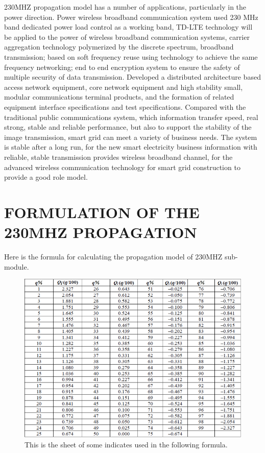 \documentclass[12pt,a4paper,twocolumn,fleqn]{narms}
\begin{document}
230MHZ propagation model has a number of applications, particularly in the power direction\cite{bb}. Power wireless broadband communication system used 230 MHz band dedicated power load control as a working band, TD-LTE technology will be applied to the power of wireless broadband communication systems, carrier aggregation technology polymerized by the discrete spectrum, broadband transmission; based on soft frequency reuse using technology to achieve the same frequency networking; end to end encryption system to ensure the safety of multiple security of data transmission. Developed a distributed architecture based access network equipment, core network equipment and high stability small, modular communications terminal products, and the formation of related equipment interface specifications and test specifications. Compared with the traditional public communications system, which information transfer speed, real strong\cite{cc}, stable and reliable performance, but also to support the stability of the image transmission, smart grid can meet a variety of business needs. The system is stable after a long run, for the new smart electricity business information with reliable, stable transmission provides wireless broadband channel, for the advanced wireless communication technology for smart grid construction to provide a good role model.

\section{FORMULATION OF THE 230MHZ PROPAGATION}
\label{sec:exp}

Here is the formula for calculating the propagation model of 230MHZ sub-module.

\begin{figure}
\centerline{\includegraphics[width=15cm]{sheet.png}}
\caption{This is the sheet of some indicates used in the following formula.}
\label{f:fralfamap}
\end{figure}
\end{document}
